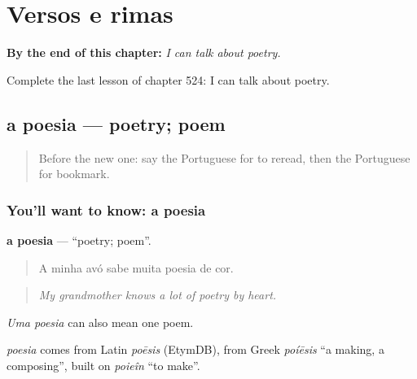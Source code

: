 
\chapter{Versos e rimas}
\label{ch:pt-versos-e-rimas}

\begin{chapteropening}
\textbf{By the end of this chapter:} \emph{I can talk about poetry.}

Complete the last lesson of chapter 524: I can talk about poetry.
\end{chapteropening}

\section[a poesia]{a poesia — poetry; poem}

\label{lesson:PT-C524-poesia}



\begin{quote}
Before the new one: say the Portuguese for to reread, then the Portuguese for bookmark.
\end{quote}

\subsection*{You'll want to know: a poesia}
\textbf{a poesia} — \textquotedblleft{}poetry; poem\textquotedblright{}.

\begin{quote}
A minha avó sabe muita poesia de cor.
\end{quote}

\begin{quote}
\emph{My grandmother knows a lot of poetry by heart.}
\end{quote}

\emph{Uma poesia} can also mean one poem.

\begin{cousinweb}
\emph{poesia} comes from Latin \emph{poēsis} (EtymDB), from Greek \emph{poíēsis} \textquotedblleft{}a making, a composing\textquotedblright{}, built on \emph{poieîn} \textquotedblleft{}to make\textquotedblright{}.
\end{cousinweb}

